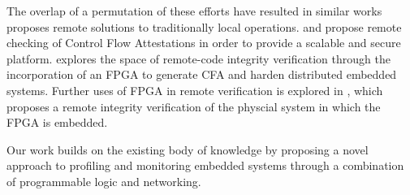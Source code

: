 The overlap of a permutation of these efforts have resulted in similar works proposes remote solutions to traditionally local operations. \cite{C-Flat} and \cite{CFA+} propose remote checking of Control Flow Attestations in order to provide a scalable and secure platform. \cite{Basile2012} explores the space of remote-code integrity verification through the incorporation of an FPGA to generate CFA and harden distributed embedded systems. Further uses of FPGA in remote verification is explored in \cite{Aysu2016}, which proposes a remote integrity verification of the physcial system in which the FPGA is embedded. 

Our work builds on the existing body of knowledge by proposing a novel approach to profiling and monitoring embedded systems through a combination of programmable logic and networking. 
